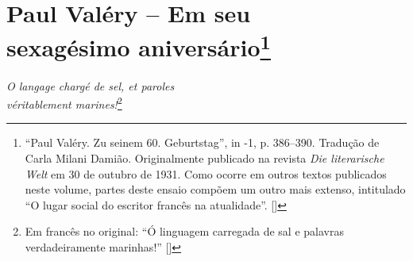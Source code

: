 \chapter[Paul Valéry -- Em seu sexagésimo aniversário]{Paul Valéry -- Em seu\\ sexagésimo aniversário\footnote[*]{``Paul Valéry. Zu seinem 60. Geburtstag'', in -1, p. 386--390. Tradução de Carla Milani Damião. Originalmente publicado na revista \emph{Die literarische Welt} em 30 de outubro de 1931. Como ocorre em outros textos publicados neste volume, partes deste ensaio compõem um outro mais extenso, intitulado ``O lugar social do escritor francês na atualidade''. []}}


\begin{flushright}
{\footnotesize\emph{O langage chargé de sel, et paroles\\ véritablement marines!}}\footnote[\dag]{Em francês no original: ``Ó linguagem carregada de sal e palavras verdadeiramente marinhas!'' []}
\end{flushright}

\bigskip
\bigskip

